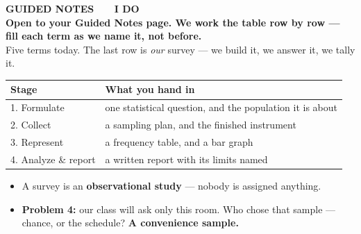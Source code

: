 \documentclass[aspectratio=169, 11pt]{beamer}
\newcommand{\redink}[1]{{\color{redacc}\bfseries #1}}
\begin{document}
{
\begin{frame}[plain]
  \vspace{1.8cm}\hspace{0.8cm}%
  \begin{minipage}{0.86\textwidth}
    {\color{goldacc}\bfseries\small GUIDED NOTES \ \textbullet\ \ I DO}\\[0.7cm]
    {\color{white}\bfseries\Large Open to your Guided Notes page. We work the table row by row
    --- fill each term as we name it, not before.}\\[0.9cm]
    {\color{frostmid}\small Five terms today. The last row is \emph{our} survey --- we build it,
    we answer it, we tally it.}
  \end{minipage}
\end{frame}
}

\begin{frame}[t, plain]
  \vspace{2pt}
  \begin{center}
    \small
    \renewcommand{\arraystretch}{1.3}
    \begin{tabular}{@{} l l @{}}
    \hline
    \textbf{Stage} & \textbf{What you hand in} \\
    \hline
    1. Formulate        & one statistical question, and the population it is about \\
    2. Collect          & a sampling plan, and the finished instrument \\
    3. Represent        & a frequency table, and a bar graph \\
    4. Analyze \& report & a written report with its limits named \\
    \hline
    \end{tabular}
  \end{center}
  \vspace{8pt}
  \begin{itemize}\setlength{\itemsep}{4pt}
    \item A survey is an \textbf{observational study} --- nobody is assigned anything.
    \item \textbf{Problem 4:} our class will ask only this room. Who chose that sample ---
          chance, or the schedule? \redink{A convenience sample.}
  \end{itemize}
\end{frame}
\end{document}
